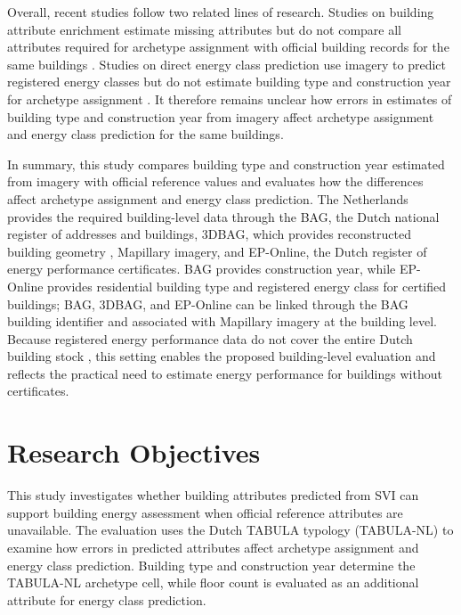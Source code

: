 Overall, recent studies follow two related lines of research. Studies on building attribute enrichment estimate missing attributes but do not compare all attributes required for archetype assignment with official building records for the same buildings \parencite{dabrock2025,wurm2021,liang2025}. Studies on direct energy class prediction use imagery to predict registered energy classes but do not estimate building type and construction year for archetype assignment \parencite{mayer2023uk,mayer2023dk,liu2025,sun2026}. It therefore remains unclear how errors in estimates of building type and construction year from imagery affect archetype assignment and energy class prediction for the same buildings.

In summary, this study compares building type and construction year estimated from imagery with official reference values and evaluates how the differences affect archetype assignment and energy class prediction. The Netherlands provides the required building-level data through the \ac{BAG}, the Dutch national register of addresses and buildings, 3DBAG, which provides reconstructed building geometry \parencite{peters2022,dukai2021}, Mapillary imagery, and EP-Online, the Dutch register of energy performance certificates. BAG provides construction year, while EP-Online provides residential building type and registered energy class for certified buildings; BAG, 3DBAG, and EP-Online can be linked through the BAG building identifier and associated with Mapillary imagery at the building level. Because registered energy performance data do not cover the entire Dutch building stock \parencite{hettinga2023}, this setting enables the proposed building-level evaluation and reflects the practical need to estimate energy performance for buildings without certificates.

\section{Research Objectives}
\label{sec:research_objectives}

This study investigates whether building attributes predicted from \ac{SVI} can support building energy assessment when official reference attributes are unavailable. The evaluation uses the Dutch TABULA typology (TABULA-NL) to examine how errors in predicted attributes affect archetype assignment and energy class prediction. Building type and construction year determine the TABULA-NL archetype cell, while floor count is evaluated as an additional attribute for energy class prediction.

